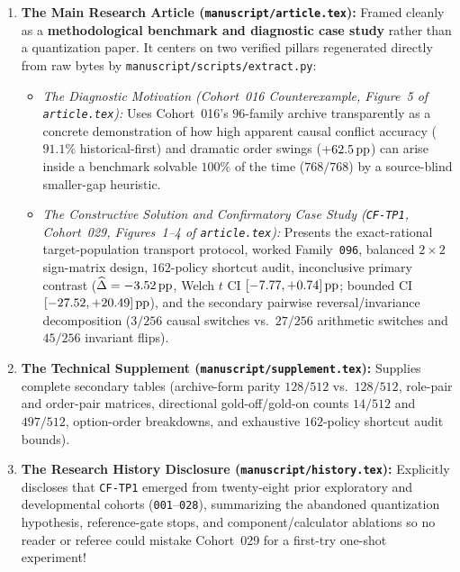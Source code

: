 \begin{enumerate}
  \item \textbf{The Main Research Article (\texttt{manuscript/article.tex}):} Framed cleanly as a \textbf{methodological benchmark and diagnostic case study} rather than a quantization paper. It centers on two verified pillars regenerated directly from raw bytes by \texttt{manuscript/scripts/extract.py}:
    \begin{itemize}
      \item \emph{The Diagnostic Motivation (Cohort~016 Counterexample, Figure~5 of \texttt{article.tex}):} Uses Cohort~016's $96$-family archive transparently as a concrete demonstration of how high apparent causal conflict accuracy ($91.1\%$ historical-first) and dramatic order swings ($+62.5\,\mathrm{pp}$) can arise inside a benchmark solvable $100\%$ of the time ($768/768$) by a source-blind smaller-gap heuristic.
      \item \emph{The Constructive Solution and Confirmatory Case Study (\texttt{CF-TP1}, Cohort~029, Figures~1--4 of \texttt{article.tex}):} Presents the exact-rational target-population transport protocol, worked Family~\texttt{096}, balanced $2\times 2$ sign-matrix design, $162$-policy shortcut audit, inconclusive primary contrast ($\widehat{\Delta} = -3.52\,\mathrm{pp}$, Welch $t$ CI $[-7.77, +0.74]\,\mathrm{pp}$; bounded CI $[-27.52, +20.49]\,\mathrm{pp}$), and the secondary pairwise reversal/invariance decomposition ($3/256$ causal switches vs.\ $27/256$ arithmetic switches and $45/256$ invariant flips).
    \end{itemize}
  \item \textbf{The Technical Supplement (\texttt{manuscript/supplement.tex}):} Supplies complete secondary tables (archive-form parity $128/512$ vs.\ $128/512$, role-pair and order-pair matrices, directional gold-off/gold-on counts $14/512$ and $497/512$, option-order breakdowns, and exhaustive $162$-policy shortcut audit bounds).
  \item \textbf{The Research History Disclosure (\texttt{manuscript/history.tex}):} Explicitly discloses that \texttt{CF-TP1} emerged from twenty-eight prior exploratory and developmental cohorts (\texttt{001}--\texttt{028}), summarizing the abandoned quantization hypothesis, reference-gate stops, and component/calculator ablations so no reader or referee could mistake Cohort~029 for a first-try one-shot experiment!
\end{enumerate}

